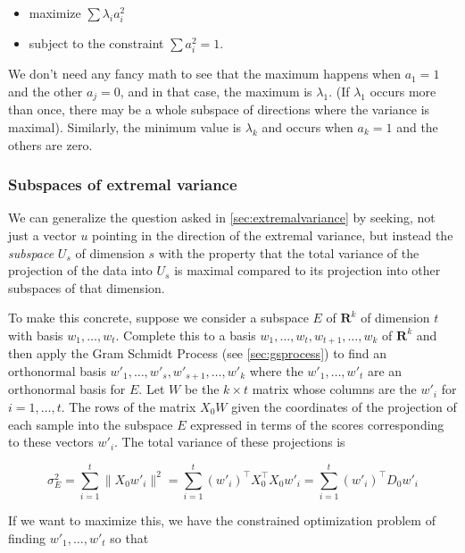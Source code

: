 \documentclass[
]{article}
\providecommand{\tightlist}{%
  \setlength{\itemsep}{0pt}\setlength{\parskip}{0pt}}
\begin{document}
\begin{itemize}
\tightlist
\item
  maximize \(\sum \lambda_{i}a_{i}^2\)
\item
  subject to the constraint \(\sum a_{i}^2 = 1\).
\end{itemize}

We don't need any fancy math to see that the maximum happens when
\(a_{1}=1\) and the other \(a_{j}=0\), and in that case, the maximum is
\(\lambda_{1}\). (If \(\lambda_{1}\) occurs more than once, there may be
a whole subspace of directions where the variance is maximal).
Similarly, the minimum value is \(\lambda_{k}\) and occurs when
\(a_{k}=1\) and the others are zero.

\hypertarget{sec:subspaces}{%
\subsubsection{Subspaces of extremal variance}\label{sec:subspaces}}

We can generalize the question asked in \cref{sec:extremalvariance} by
seeking, not just a vector \(u\) pointing in the direction of the
extremal variance, but instead the \emph{subspace} \(U_{s}\) of
dimension \(s\) with the property that the total variance of the
projection of the data into \(U_{s}\) is maximal compared to its
projection into other subspaces of that dimension.

To make this concrete, suppose we consider a subspace \(E\) of
\(\mathbf{R}^{k}\) of dimension \(t\) with basis
\(w_{1},\ldots, w_{t}\). Complete this to a basis
\(w_{1},\ldots, w_{t},w_{t+1},\ldots, w_{k}\) of \(\mathbf{R}^{k}\) and
then apply the Gram Schmidt Process (see \cref{sec:gsprocess}) to find
an orthonormal basis \(w'_{1},\ldots,w'_{s},w'_{s+1},\ldots, w'_{k}\)
where the \(w'_{1},\ldots, w'_{t}\) are an orthonormal basis for \(E\).
Let \(W\) be the \(k\times t\) matrix whose columns are the \(w'_{i}\)
for \(i=1,\ldots,t\). The rows of the matrix \(X_{0}W\) given the
coordinates of the projection of each sample into the subspace \(E\)
expressed in terms of the scores corresponding to these vectors
\(w'_{i}\). The total variance of these projections is

\[
\sigma_{E}^2 = \sum_{i=1}^{t} \|X_{0}w'_{i}\|^2 = \sum_{i=1}^{t} (w'_{i})^{\intercal}X_{0}^{\intercal}X_{0}w'_{i}  = \sum_{i=1}^{t} (w'_{i})^{\intercal}D_{0}w'_{i}
\]

If we want to maximize this, we have the constrained optimization
problem of finding \(w'_{1},\ldots, w'_{t}\) so that
\end{document}
